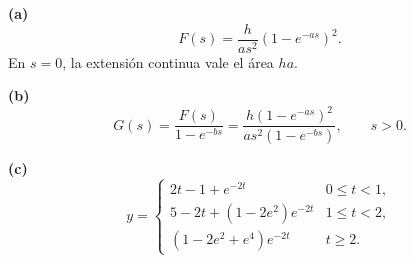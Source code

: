 \noindent\textbf{(a)} \[F(s)=\frac{h}{as^2}(1-e^{-as})^2.\]
En \(s=0\), la extensión continua vale el área \(ha\).

\noindent\textbf{(b)} \[G(s)=\frac{F(s)}{1-e^{-bs}}=\frac{h(1-e^{-as})^2}{as^2(1-e^{-bs})},\qquad s>0.\]

\noindent\textbf{(c)} \[y=\begin{cases}2t-1+e^{-2t}&0\le t<1,\\5-2t+(1-2e^2)e^{-2t}&1\le t<2,\\(1-2e^2+e^4)e^{-2t}&t\ge2.\end{cases}\]
